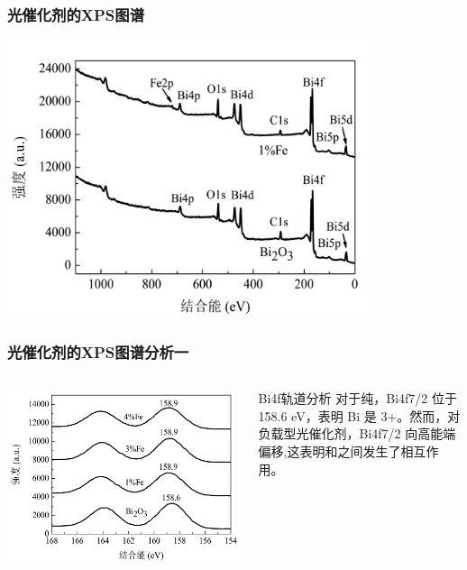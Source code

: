 \documentclass[xetex,compress]{mybeamer}
\begin{document}
\begin{frame}
\frametitle{光催化剂的XPS图谱}
\begin{block}{}
\centering
\includegraphics[width=0.8\textwidth]{figures/三氧化二铁XPS.jpg} 
\end{block}
\end{frame}

\begin{frame}
\frametitle{光催化剂的XPS图谱分析一}
\begin{columns}
\begin{block}{}
\centering
\includegraphics[width=\linewidth]{figures/三氧化二铁BI4F.jpg} 
\end{block}
\begin{block}{Bi4f轨道分析}
对于纯，Bi4f7/2 位于 158.6 eV，表明 Bi 是 3+。然而，对负载型光催化剂，Bi4f7/2 向高能端偏移,这表明和之间发生了相互作用。
\end{block}
\end{columns}
\end{frame}
\end{document}
